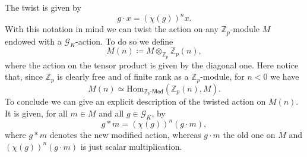 \begin{ntt}[]
	The twist is given by
	\begin{equation*}
		g \cdot x = \left( \chi(g) \right)^n x
	.\end{equation*}
	With this notation in mind we can twist the action on any $\mathbb{Z}_{p}$-module
	$M$ endowed with a $\mathscr{G}_K$-action.
	To do so we define
	\begin{equation*}
		M(n) \coloneqq M \otimes_{\mathbb{Z}_{p}} \mathbb{Z}_{p}(n)
	,\end{equation*}
	where the action on the tensor product is given by the diagonal one.
	Here notice that, since $\mathbb{Z}_{p}$ is clearly free and of finite rank as
	a $\mathbb{Z}_{p}$-module, for $n < 0$ we have
	\begin{equation*}
		M(n) \simeq \mathrm{Hom}_{ \mathbb{Z}_{p}\text{-}\mathsf{Mod} }
		\left( \mathbb{Z}_{p}(n), M\right)
	.\end{equation*}
	To conclude we can give an explicit description of the twisted action on $M(n)$.
	It is given, for all $m \in M$ and all $g \in \mathscr{G}_K$, by
	\begin{equation*}
		g * m = (\chi(g))^n (g \cdot m)
	,\end{equation*}
	where $g * m$ denotes the new modified action, whereas $g \cdot m$ the old one on $M$
	and $(\chi(g))^n (g \cdot m)$ is just scalar multiplication.
\end{ntt}


